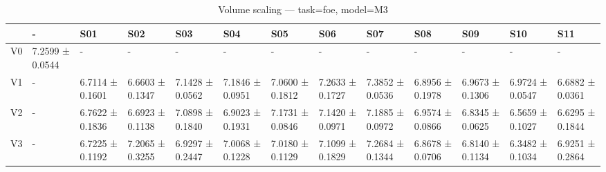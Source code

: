 \begin{table}[htbp]
\centering
\caption{Volume scaling — task=foe, model=M3}
\label{tab:volume:foe:M3}
\begin{tabular}{lllllllllllll}
\toprule
\toprule
 & - & S01 & S02 & S03 & S04 & S05 & S06 & S07 & S08 & S09 & S10 & S11 \\
\midrule
\midrule
V0 & 7.2599 ± 0.0544 & - & - & - & - & - & - & - & - & - & - & - \\
V1 & - & 6.7114 ± 0.1601 & 6.6603 ± 0.1347 & 7.1428 ± 0.0562 & 7.1846 ± 0.0951 & 7.0600 ± 0.1812 & 7.2633 ± 0.1727 & 7.3852 ± 0.0536 & 6.8956 ± 0.1978 & 6.9673 ± 0.1306 & 6.9724 ± 0.0547 & 6.6882 ± 0.0361 \\
V2 & - & 6.7622 ± 0.1836 & 6.6923 ± 0.1138 & 7.0898 ± 0.1840 & 6.9023 ± 0.1931 & 7.1731 ± 0.0846 & 7.1420 ± 0.0971 & 7.1885 ± 0.0972 & 6.9574 ± 0.0866 & 6.8345 ± 0.0625 & 6.5659 ± 0.1027 & 6.6295 ± 0.1844 \\
V3 & - & 6.7225 ± 0.1192 & 7.2065 ± 0.3255 & 6.9297 ± 0.2447 & 7.0068 ± 0.1228 & 7.0180 ± 0.1129 & 7.1099 ± 0.1829 & 7.2684 ± 0.1344 & 6.8678 ± 0.0706 & 6.8140 ± 0.1134 & 6.3482 ± 0.1034 & 6.9251 ± 0.2864 \\
\bottomrule
\end{tabular}\end{table}
